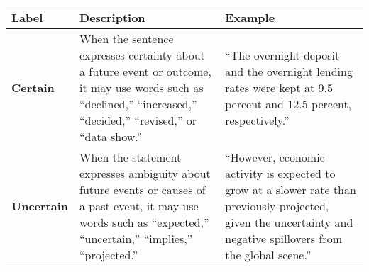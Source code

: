 \begin{table*}
    \caption{}
    \vspace{1em}
    \begin{tabular}{p{}p{}p{}}
    \toprule
    \textbf{Label} & \textbf{Description} & \textbf{Example} \\
    \midrule
    \textbf{Certain} & When the sentence expresses certainty about a future event or outcome, it may use words such as “declined,” “increased,” “decided,” “revised,” or “data show.” & “The overnight deposit and the overnight lending rates were kept at 9.5 percent and 12.5 percent, respectively.” \\
    \midrule
    \textbf{Uncertain} & When the statement expresses ambiguity about future events or causes of a past event, it may use words such as “expected,” “uncertain,” “implies,” “projected.” & “However, economic activity is expected to grow at a slower rate than previously projected, given the uncertainty and negative spillovers from the global scene.” \\
    \bottomrule
    \end{tabular}
    \label{tb:cbe_certainty_guide}
    \end{table*}